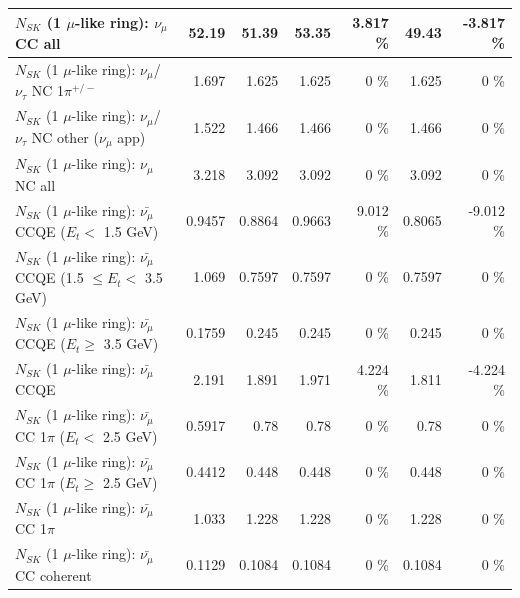\begin{table}
\begin{tabular}{| l | r | r | r  r | r  r |}
                                $N_{SK}$ (1 $\mu$-like ring): $\nu_{\mu}$ CC all &           52.19 &           51.39 &           53.35 &    3.817 \%  &           49.43 &   -3.817 \%  \\ 
\hline
              $N_{SK}$ (1 $\mu$-like ring): $\nu_\mu$/$\nu_\tau$ NC 1$\pi^{+/-}$ &           1.697 &           1.625 &           1.625 &        0 \%  &           1.625 &        0 \%  \\ 
     $N_{SK}$ (1 $\mu$-like ring): $\nu_\mu$/$\nu_\tau$ NC other ($\nu_\mu$ app) &           1.522 &           1.466 &           1.466 &        0 \%  &           1.466 &        0 \%  \\ 
                                $N_{SK}$ (1 $\mu$-like ring): $\nu_{\mu}$ NC all &           3.218 &           3.092 &           3.092 &        0 \%  &           3.092 &        0 \%  \\ 
\hline
\hline
\hline
          $N_{SK}$ (1 $\mu$-like ring): $\bar{\nu_\mu}$ CCQE ($E_{t} <$ 1.5 GeV) &          0.9457 &          0.8864 &          0.9663 &    9.012 \%  &          0.8065 &   -9.012 \%  \\ 
 $N_{SK}$ (1 $\mu$-like ring): $\bar{\nu_\mu}$ CCQE (1.5 $\leq E_{t} <$ 3.5 GeV) &           1.069 &          0.7597 &          0.7597 &        0 \%  &          0.7597 &        0 \%  \\ 
       $N_{SK}$ (1 $\mu$-like ring): $\bar{\nu_\mu}$ CCQE ($E_{t} \geq$ 3.5 GeV) &          0.1759 &           0.245 &           0.245 &        0 \%  &           0.245 &        0 \%  \\ 
\hline
                              $N_{SK}$ (1 $\mu$-like ring): $\bar{\nu_\mu}$ CCQE &           2.191 &           1.891 &           1.971 &    4.224 \%  &           1.811 &   -4.224 \%  \\ 
\hline
     $N_{SK}$ (1 $\mu$-like ring): $\bar{\nu_\mu}$ CC 1$\pi$ ($E_{t} <$ 2.5 GeV) &          0.5917 &            0.78 &            0.78 &        0 \%  &            0.78 &        0 \%  \\ 
  $N_{SK}$ (1 $\mu$-like ring): $\bar{\nu_\mu}$ CC 1$\pi$ ($E_{t} \geq$ 2.5 GeV) &          0.4412 &           0.448 &           0.448 &        0 \%  &           0.448 &        0 \%  \\ 
\hline
                         $N_{SK}$ (1 $\mu$-like ring): $\bar{\nu_\mu}$ CC 1$\pi$ &           1.033 &           1.228 &           1.228 &        0 \%  &           1.228 &        0 \%  \\ 
                       $N_{SK}$ (1 $\mu$-like ring): $\bar{\nu_\mu}$ CC coherent &          0.1129 &          0.1084 &          0.1084 &        0 \%  &          0.1084 &        0 \%  \\ 

\end{tabular}
\end{table}
